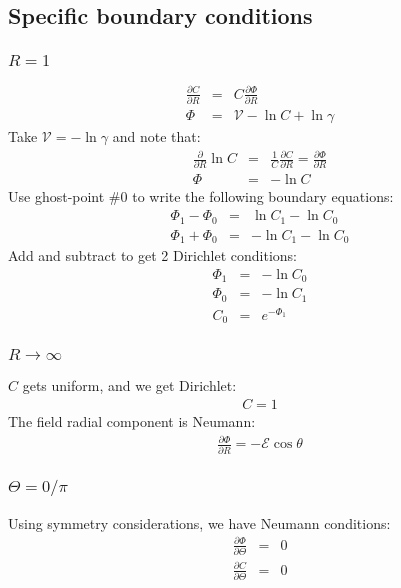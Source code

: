 \documentclass[11pt]{article}
\begin{document}
\subsection{Specific boundary conditions}
\subsubsection{$R = 1$}
\begin{eqnarray}
  \frac{\partial C}{\partial R} &=&
   C \frac{\partial \varPhi}{\partial R} \\
  \varPhi &=& \mathscr{V} - \ln C + \ln \gamma
\end{eqnarray}
Take $\mathscr{V} = -\ln \gamma$ and note that:
\begin{eqnarray}
  \frac{\partial}{\partial R} \ln C &=&
  \frac{1}{C}\frac{\partial C}{\partial R} =
  \frac{\partial \varPhi}{\partial R} \\
  \varPhi &=& -\ln C
\end{eqnarray}
Use ghost-point \#0 to write the following boundary equations:
\begin{eqnarray}
  \varPhi_1 - \varPhi_0 &=& \ln C_1 - \ln C_0 \\
  \varPhi_1 + \varPhi_0 &=& - \ln C_1 - \ln C_0
\end{eqnarray}
Add and subtract to get 2 Dirichlet conditions:
\begin{eqnarray}
  \varPhi_1 &=& - \ln C_0 \\
  \varPhi_0 &=& - \ln C_1 \\
  C_0 &=& e^{-\varPhi_1}
\end{eqnarray}
\subsubsection{$R \rightarrow \infty$}
$C$ gets uniform, and we get Dirichlet:
\begin{eqnarray}
 C = 1
\end{eqnarray}
The field radial component is Neumann:
\begin{eqnarray}
 \frac{\partial \varPhi}{\partial R} = -\mathscr{E} \cos \theta
\end{eqnarray}
\subsubsection{$\Theta = 0/\pi$}
Using symmetry considerations, we have Neumann conditions:
\begin{eqnarray}
 \frac{\partial \varPhi}{\partial \Theta} &=& 0 \\
 \frac{\partial C}{\partial \Theta} &=& 0 \\
\end{eqnarray}
\end{document}
